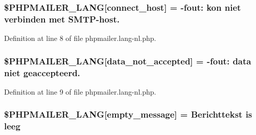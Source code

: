 \subsubsection[{\texorpdfstring{\$\+P\+H\+P\+M\+A\+I\+L\+E\+R\+\_\+\+L\+A\+NG}{$PHPMAILER_LANG}}]{\setlength{\rightskip}{0pt plus 5cm}\$P\+H\+P\+M\+A\+I\+L\+E\+R\+\_\+\+L\+A\+NG\mbox{[}\textquotesingle{}connect\+\_\+host\textquotesingle{}\mbox{]} = -\/fout\+: kon niet verbinden met {\bf S\+M\+TP}-\/host.\textquotesingle{}}\hypertarget{phpmailer_8lang-nl_8php_a2ee0cc637a06b96e45600db31c6799ee}{}\label{phpmailer_8lang-nl_8php_a2ee0cc637a06b96e45600db31c6799ee}


Definition at line 8 of file phpmailer.\+lang-\/nl.\+php.

\subsubsection[{\texorpdfstring{\$\+P\+H\+P\+M\+A\+I\+L\+E\+R\+\_\+\+L\+A\+NG}{$PHPMAILER_LANG}}]{\setlength{\rightskip}{0pt plus 5cm}\$P\+H\+P\+M\+A\+I\+L\+E\+R\+\_\+\+L\+A\+NG\mbox{[}\textquotesingle{}data\+\_\+not\+\_\+accepted\textquotesingle{}\mbox{]} = -\/fout\+: {\bf data} niet geaccepteerd.\textquotesingle{}}\hypertarget{phpmailer_8lang-nl_8php_a814c6b191205d2361b3233e9c9d6fda5}{}\label{phpmailer_8lang-nl_8php_a814c6b191205d2361b3233e9c9d6fda5}


Definition at line 9 of file phpmailer.\+lang-\/nl.\+php.

\subsubsection[{\texorpdfstring{\$\+P\+H\+P\+M\+A\+I\+L\+E\+R\+\_\+\+L\+A\+NG}{$PHPMAILER_LANG}}]{\setlength{\rightskip}{0pt plus 5cm}\$P\+H\+P\+M\+A\+I\+L\+E\+R\+\_\+\+L\+A\+NG\mbox{[}\textquotesingle{}empty\+\_\+message\textquotesingle{}\mbox{]} = \textquotesingle{}Berichttekst is leeg\textquotesingle{}}\hypertarget{phpmailer_8lang-nl_8php_a33772099f637c9d6c2cd7425e0e37fed}{}\label{phpmailer_8lang-nl_8php_a33772099f637c9d6c2cd7425e0e37fed}


